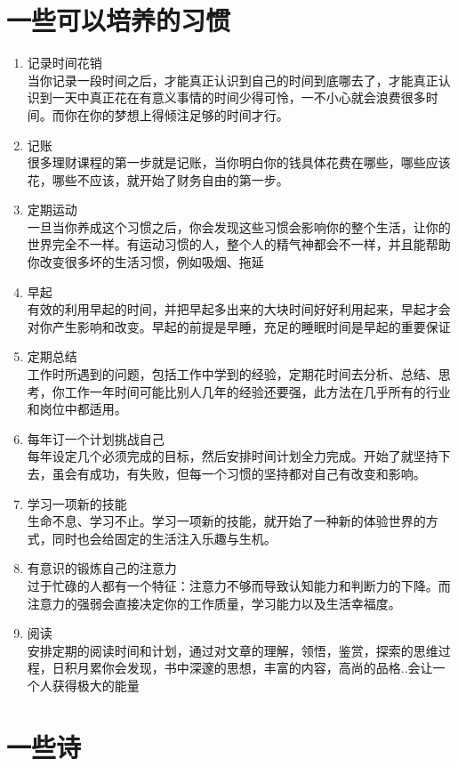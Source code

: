 \documentclass[UTF8,a4paper,8pt]{ctexbook}
\begin{document}
\newpage
\section{一些可以培养的习惯}
	\begin{enumerate}
		\item 记录时间花销\\
			当你记录一段时间之后，才能真正认识到自己的时间到底哪去了，才能真正认识到一天中真正花在有意义事情的时间少得可怜，一不小心就会浪费很多时间。而你在你的梦想上得倾注足够的时间才行。		
		\item 记账\\
			很多理财课程的第一步就是记账，当你明白你的钱具体花费在哪些，哪些应该花，哪些不应该，就开始了财务自由的第一步。
		\item 定期运动\\
			一旦当你养成这个习惯之后，你会发现这些习惯会影响你的整个生活，让你的世界完全不一样。有运动习惯的人，整个人的精气神都会不一样，并且能帮助你改变很多坏的生活习惯，例如吸烟、拖延
		\item 早起\\
			有效的利用早起的时间，并把早起多出来的大块时间好好利用起来，早起才会对你产生影响和改变。早起的前提是早睡，充足的睡眠时间是早起的重要保证
		\item 定期总结\\
			工作时所遇到的问题，包括工作中学到的经验，定期花时间去分析、总结、思考，你工作一年时间可能比别人几年的经验还要强，此方法在几乎所有的行业和岗位中都适用。
		\item 每年订一个计划挑战自己\\
			每年设定几个必须完成的目标，然后安排时间计划全力完成。开始了就坚持下去，虽会有成功，有失败，但每一个习惯的坚持都对自己有改变和影响。
		\item 学习一项新的技能\\
			生命不息、学习不止。学习一项新的技能，就开始了一种新的体验世界的方式，同时也会给固定的生活注入乐趣与生机。
		\item 有意识的锻炼自己的注意力\\
			过于忙碌的人都有一个特征：注意力不够而导致认知能力和判断力的下降。而注意力的强弱会直接决定你的工作质量，学习能力以及生活幸福度。
		\item 阅读\\
			安排定期的阅读时间和计划，通过对文章的理解，领悟，鉴赏，探索的思维过程，日积月累你会发现，书中深邃的思想，丰富的内容，高尚的品格..会让一个人获得极大的能量
	\end{enumerate}

\newpage 
\section{一些诗}
\end{document}
